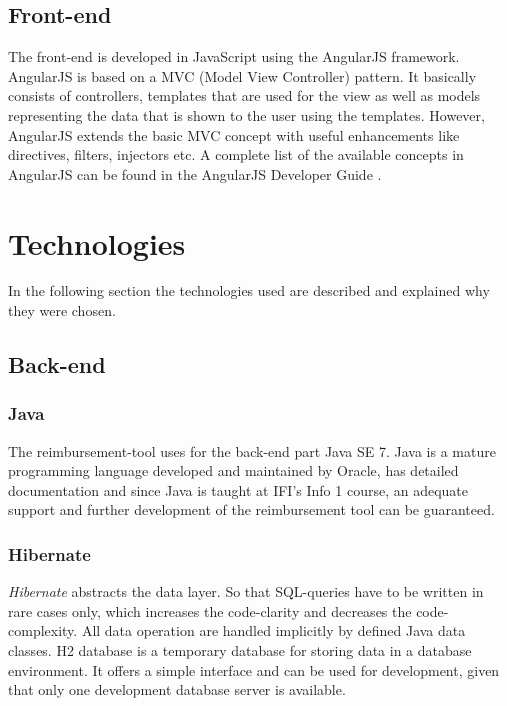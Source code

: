 \subsection{Front-end}
The front-end is developed in JavaScript using the AngularJS framework\cite{angular}. AngularJS is based on a MVC (Model View Controller) pattern. It basically consists of controllers, templates that are used for the view  as well as models representing the data that is shown to the user using the templates. However, AngularJS  extends the basic MVC concept with useful enhancements like directives, filters, injectors etc. A complete list of the available concepts in AngularJS can be found in the AngularJS Developer Guide \cite{angular-devguide}.

\section{Technologies}

In the following section the technologies used are described and explained why they were chosen.

\subsection{Back-end}

\subsubsection{Java}
The reimbursement-tool uses for the back-end part Java SE 7. Java is a mature programming language developed and maintained by Oracle\cite{java}, has detailed documentation and since Java is taught at IFI's Info 1 course, an adequate support and further development of the reimbursement tool can be guaranteed.

\subsubsection{Hibernate}
\textit{Hibernate} abstracts the data layer. So that SQL-queries have to be written in rare cases only, which increases the code-clarity and decreases the code-complexity. All data operation are handled implicitly by defined Java data classes.\newline
H2 database is a temporary database for storing data in a database environment. It offers a simple interface and can be used for development, given that only one development database server is available. \cite{hibernate}

